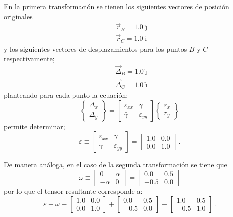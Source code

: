 \documentclass[../notas medios.tex]{subfiles}
\begin{document}
En la primera transformación se tienen los siguientes vectores de posición 
originales
\begin{align*}
&\vec{r}_B = 1.0\hat \jmath\\
&\vec{r}_C = 1.0\hat \imath
\end{align*}
y los siguientes vectores de desplazamientos para los puntos $B$ y $C$ 
respectivamente;
\begin{align*}
&\vec \Delta_B = 1.0\hat \jmath\\
&\vec \Delta_C = 1.0\hat \imath
\end{align*}
planteando para cada punto la ecuación:
\[\begin{Bmatrix}
\Delta_x\\
\Delta_y
\end{Bmatrix} = \begin{bmatrix}
\varepsilon_{xx} &\bar{\gamma} \\
\bar{\gamma} &\varepsilon_{yy}
\end{bmatrix}\begin{Bmatrix}
r_x\\
r_y
\end{Bmatrix}\]
permite determinar;
\[\varepsilon \equiv \begin{bmatrix}
\varepsilon_{xx} &\bar{\gamma}\\
\bar{\gamma} &\varepsilon_{yy}
\end{bmatrix} = \begin{bmatrix}
1.0 &0.0\\
0.0 &1.0
\end{bmatrix}\, .\]

De manera análoga, en el caso de la segunda transformación se tiene que
\[\omega  \equiv \begin{bmatrix}
0 &\alpha \\
-\alpha &0
\end{bmatrix} = \begin{bmatrix}
0.0 &0.5\\
-0.5 &0.0
\end{bmatrix}\]
por lo que el tensor resultante corresponde a:
\[\varepsilon  + \omega  \equiv \begin{bmatrix}
1.0 &0.0\\
0.0 &1.0
\end{bmatrix} + \begin{bmatrix}
0.0 &0.5\\
-0.5 &0.0
\end{bmatrix} \equiv \begin{bmatrix}
1.0 &0.5\\
-0.5 &1.0
\end{bmatrix}\, .\]
\end{document}
